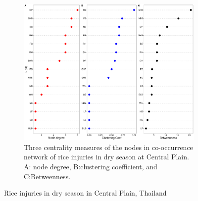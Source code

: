 \begin{figure}
\begin{subfigure}[b]{1\textwidth}
        \includegraphics[width = 1\textwidth]{figures/yield_dif_nodepropCentral_Plain.pdf}
        \caption{Three centrality measures of the nodes in co-occurrence network of rice injuries in dry season at Central Plain. A: node degree, B:clustering coefficient, and C:Betweenness.}
        \label{fig:nodepropdifyieldCP}
    \end{subfigure}
    \caption{Rice injuries in dry season in Central Plain, Thailand}
    \label{fig:CP_ds}
\end{figure}
 

